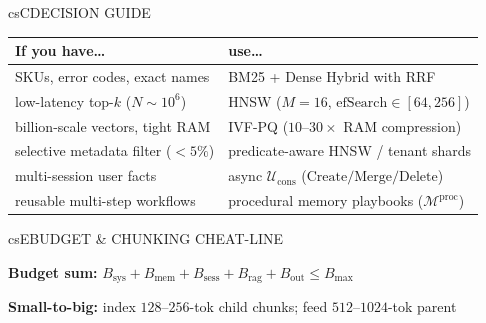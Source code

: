 \documentclass[../../../../master.tex]{subfiles}
\begin{document}
\begin{cscolumns}
\begin{cscard}{csC}{DECISION GUIDE}
  \renewcommand{\arraystretch}{1.15}\small
  \begin{tabular}{@{}>{\raggedright\arraybackslash}p{3.1cm}>{\raggedright\arraybackslash}p{4.7cm}@{}}
    \textbf{If you have\ldots} & \textbf{use\ldots}\\ \hline
    SKUs, error codes, exact names & BM25 + Dense Hybrid with RRF\\
    low-latency top-$k$ ($N\sim 10^6$) & HNSW ($M=16$, $\mathrm{efSearch}\in[64,256]$)\\
    billion-scale vectors, tight RAM & IVF-PQ ($10\text{--}30\times$ RAM compression)\\
    selective metadata filter ($<5\%$) & predicate-aware HNSW / tenant shards\\
    multi-session user facts & async $\mathcal{U}_{\mathrm{cons}}$ ($\mathrm{Create}/\mathrm{Merge}/\mathrm{Delete}$)\\
    reusable multi-step workflows & procedural memory playbooks ($\mathcal{M}^{\mathrm{proc}}$)\\
  \end{tabular}
\end{cscard}

\begin{cscard}{csE}{BUDGET \& CHUNKING CHEAT-LINE}
  \begin{csbul}
    \item \textbf{Budget sum:} $B_{\mathrm{sys}}+B_{\mathrm{mem}}+B_{\mathrm{sess}}+B_{\mathrm{rag}}+B_{\mathrm{out}}\le B_{\max}$
    \item \textbf{Small-to-big:} index $128\text{--}256$-tok child chunks; feed $512\text{--}1024$-tok parent
  \end{csbul}
\end{cscard}


\end{cscolumns}
\end{document}
